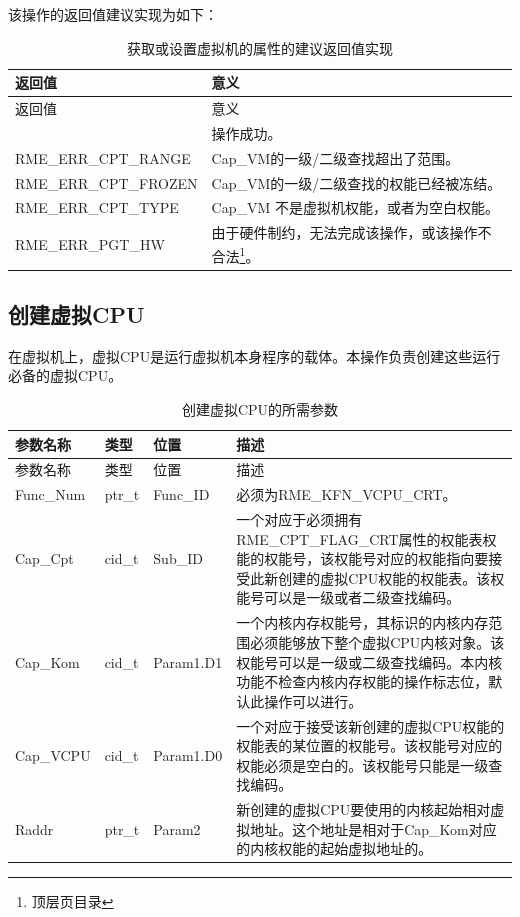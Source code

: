 该操作的返回值建议实现为如下：

\begin{xltabular}{\textwidth}{@{}>{\hsize\raggedright\arraybackslash}X>{\hsize\raggedright\arraybackslash}X@{}}
\caption{获取或设置虚拟机的属性的建议返回值实现}\label{tab:8-80-get-or-set-virtual-machine-attributes-suggested-return-values}\\
\toprule
返回值 & 意义\tabularnewline
\endfirsthead
\toprule
返回值 & 意义\tabularnewline
\midrule
\endhead
\bottomrule
{} & 操作成功。\tabularnewline
    RME\_ERR\_CPT\_RANGE & Cap\_VM的一级/二级查找超出了范围。\tabularnewline
    RME\_ERR\_CPT\_FROZEN & Cap\_VM的一级/二级查找的权能已经被冻结。\tabularnewline
    RME\_ERR\_CPT\_TYPE & Cap\_VM 不是虚拟机权能，或者为空白权能。\tabularnewline
    RME\_ERR\_PGT\_HW & 由于硬件制约，无法完成该操作，或该操作不合法\footnote{顶层页目录}。\tabularnewline
\end{xltabular}

\subsection{创建虚拟CPU}\label{subsec:8-create-virtual-cpu}

在虚拟机上，虚拟CPU是运行虚拟机本身程序的载体。本操作负责创建这些运行必备的虚拟CPU。

\begin{xltabular}{\textwidth}{@{}>{\hsize\raggedright\arraybackslash}X>{\hsize\raggedright\arraybackslash}X>{\hsize\raggedright\arraybackslash}X>{\hsize\raggedright\arraybackslash}X@{}}
\caption{创建虚拟CPU的所需参数}\label{tab:8-81-create-virtual-cpu-parameters}\\
\toprule
参数名称 & 类型 & 位置 & 描述\tabularnewline
\endfirsthead
\toprule
参数名称 & 类型 & 位置 & 描述\tabularnewline
\midrule
\endhead
\bottomrule
\endlastfoot
Func\_Num & ptr\_t & Func\_ID &
必须为RME\_KFN\_VCPU\_CRT。\tabularnewline
Cap\_Cpt & cid\_t & Sub\_ID &
一个对应于必须拥有RME\_CPT\_FLAG\_CRT属性的权能表权能的权能号，该权能号对应的权能指向要接受此新创建的虚拟CPU权能的权能表。该权能号可以是一级或者二级查找编码。\tabularnewline
Cap\_Kom & cid\_t & Param1.D1 &
一个内核内存权能号，其标识的内核内存范围必须能够放下整个虚拟CPU内核对象。该权能号可以是一级或二级查找编码。本内核功能不检查内核内存权能的操作标志位，默认此操作可以进行。\tabularnewline
Cap\_VCPU & cid\_t & Param1.D0 &
一个对应于接受该新创建的虚拟CPU权能的权能表的某位置的权能号。该权能号对应的权能必须是空白的。该权能号只能是一级查找编码。\tabularnewline
Raddr & ptr\_t & Param2 &
新创建的虚拟CPU要使用的内核起始相对虚拟地址。这个地址是相对于Cap\_Kom对应的内核权能的起始虚拟地址的。\tabularnewline
\end{xltabular}


